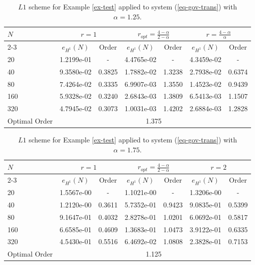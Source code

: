 \documentclass[11pt]{article}
\numberwithin{equation}{section}
\begin{document}
\begin{table}[!ht]
\caption{$L1$ scheme for Example \ref{ex-test} applied to system (\ref{eq-gov-trans}) with $\alpha=1.25$.}\label{table-test1}
\renewcommand{\arraystretch}{1}
\def\temptablewidth{0.95\textwidth}
\begin{center}
 \begin{tabular*}{\temptablewidth}{@{\extracolsep{\fill}}lcccccc}\hline
 $N$ &\multicolumn{2}{c}{$r=1$} &\multicolumn{2}{c}{$r_{opt}=\frac{4-\alpha}{2-\alpha}$} &\multicolumn{2}{c}{$r=\frac{4-\alpha}{\alpha}$}    \\
 \cline{2-3}\cline{4-5}\cline{6-7}
 & $e_{H^1}(N)$         &Order     &$e_{H^1}(N)$    &Order    &$e_{H^1}(N)$ &Order     \\ \hline
 20 &1.2199e-01     &-       &4.4765e-02   &-        &4.3459e-02  &-  \\
 40 &9.3580e-02     &0.3825  &1.7882e-02   &1.3238   &2.7938e-02  &0.6374    \\
 80 &7.4264e-02     &0.3335  &6.9907e-03   &1.3550   &1.4523e-02  &0.9439 \\
 160 &5.9328e-02    &0.3240  &2.6843e-03   &1.3809   &6.5413e-03  &1.1507    \\
 320 &4.7945e-02    &0.3073  &1.0031e-03   &1.4202   &2.6884e-03  &1.2828    \\\hline
 Optimal Order  &\multicolumn{6}{c}{1.375} \\ \hline
\end{tabular*}
\end{center}
\end{table}

\begin{table}[!ht]
\caption{$L1$ scheme for Example \ref{ex-test} applied to system (\ref{eq-gov-trans}) with $\alpha=1.75$.}\label{table-test2}
\renewcommand{\arraystretch}{1}
\def\temptablewidth{0.95\textwidth}
\begin{center}
 \begin{tabular*}{\temptablewidth}{@{\extracolsep{\fill}}lcccccc}\hline
 $N$ &\multicolumn{2}{c}{$r=1$} &\multicolumn{2}{c}{$r_{opt}=\frac{4-\alpha}{2-\alpha}$} &\multicolumn{2}{c}{$r=2$}    \\
 \cline{2-3}\cline{4-5}\cline{6-7}
 & $e_{H^1}(N)$         &Order     &$e_{H^1}(N)$    &Order    &$e_{H^1}(N)$ &Order     \\ \hline
 20 &1.5567e-00     &-       &1.1021e-00   &-        &1.3206e-00  &-  \\
 40 &1.2120e-00     &0.3611  &5.7352e-01   &0.9423   &9.0835e-01  &0.5399    \\
 80 &9.1647e-01     &0.4032  &2.8278e-01   &1.0201   &6.0692e-01  &0.5817 \\
 160 &6.6585e-01    &0.4609  &1.3683e-01   &1.0473   &3.9122e-01  &0.6335    \\
 320 &4.5430e-01    &0.5516  &6.4692e-02   &1.0808   &2.3828e-01  &0.7153    \\\hline
 Optimal Order  &\multicolumn{6}{c}{1.125} \\ \hline
\end{tabular*}
\end{center}
\end{table}
\end{document}
